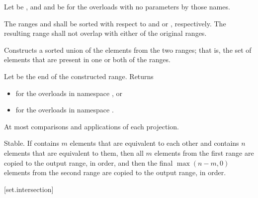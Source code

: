 \begin{itemdescr}
\pnum
Let  be ,
and  and  be 
for the overloads with no parameters by those names.

\pnum
\requires
The ranges  and  shall be
sorted with respect to  and
 or , respectively.
The resulting range shall not overlap with either of the original ranges.

\pnum
\effects
Constructs a sorted union of the elements from the two ranges;
that is, the set of elements that are present in one or both of the ranges.

\pnum
\returns
Let  be the end of the constructed range.
Returns
\begin{itemize}
\item {} for the overloads in namespace , or
\item {} for the overloads in
  namespace .
\end{itemize}

\pnum
\complexity
At most
comparisons and applications of each projection.

\pnum
\remarks
Stable.
If  contains $m$ elements that are equivalent to
each other and  contains $n$ elements that are equivalent
to them, then all $m$ elements from the first range are copied to the output
range, in order, and then the final $\max(n - m, 0)$ elements from the second range are
copied to the output range, in order.
\end{itemdescr}

[set.intersection]{}


